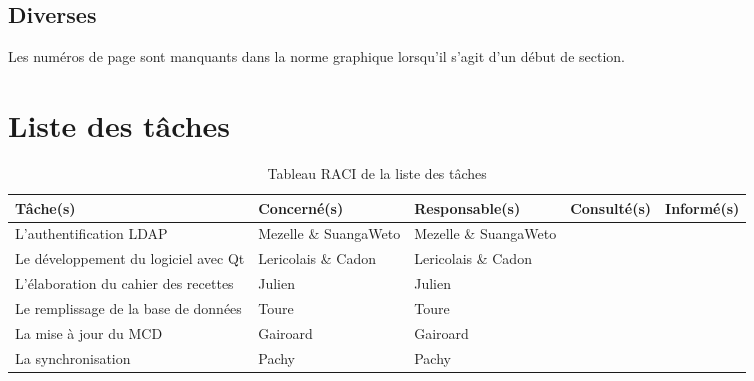 \documentclass[11pt,fleqn]{report}
\begin{document}
\subsection{Diverses}

Les numéros de page sont manquants dans la norme graphique lorsqu'il s'agit d'un début de section.


\newpage
\section{Liste des tâches}

\begin{table}[h]
	\begin{tabularx}{\linewidth}{X X X X X}
		\toprule
	\textbf{Tâche(s)} &	\textbf{Concerné(s)} & \textbf{Responsable(s)} & \textbf{Consulté(s)} & \textbf{Informé(s)} \\
		\midrule
	L'authentification LDAP &	Mezelle \& SuangaWeto  & Mezelle \& SuangaWeto  & \amo & \amo \\
	    \midrule 
	Le développement du logiciel avec Qt & Lericolais \& Cadon & Lericolais \& Cadon & \amo  & \amo \\
	\midrule
	L'élaboration du cahier des recettes  & Julien & Julien & \amo  & \amo \\
	\midrule
	Le remplissage de la base de données  & Toure & Toure & \amo  & \amo \\
	\midrule	
	La mise à jour du MCD & Gairoard & Gairoard & \amo & \amo \\
	\midrule	
	La synchronisation& Pachy & Pachy & \amo  & \amo \\
	\midrule
	\end{tabularx}
	\caption{Tableau RACI de la liste des tâches}
\end{table}

\end{document}
